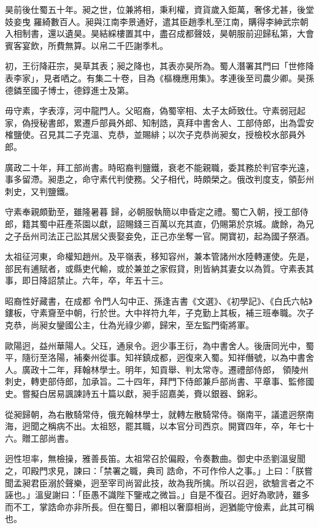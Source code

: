 \begin{pinyinscope}
 昊前後仕蜀五十年。昶之世，位兼將相，秉利權，資貨歲入鉅萬，奢侈尤甚，後堂妓妾曳
 羅綺數百人。昶與江南李景通好，遣其臣趙季札至江南，購得李紳武宗朝入相制書，還以遺昊。昊結綵樓置其中，盡召成都聲妓，昊朝服前迎歸私第，大會賓客宴飲，所費無算。以帛二千匹謝季札。



 初，王衍降莊宗，昊草其表；昶之降也，其表亦昊所為。蜀人潛署其門曰「世修降表李家」，見者哂之。有集二十卷，目為《樞機應用集》。孝連後至司農少卿。昊孫德鏻至國子博士，德錞進士及第。



 毋守素，字表淳，河中龍門人。父昭裔，偽蜀宰相、太子太師致仕。守素弱冠起家，偽授秘書郎，累遷戶部員外郎、知制誥，真拜中書舍人、工部侍郎，出為雲安榷鹽使。召見其二子克溫、克恭，並賜緋；以次子克恭尚昶女，授檢校水部員外郎。



 廣政二十年，拜工部尚書。時昭裔判鹽鐵，衰老不能親職，委其務於判官李光遠，事多留滯。昶患之，命守素代判使務。父子相代，時頗榮之。俄改判度支，領彭州刺史，又判鹽鐵。



 守素奉親頗勤至，雖隆暑暮
 歸，必朝服執簡以申昏定之禮。蜀亡入朝，授工部侍郎，籍其蜀中莊產茶園以獻，詔賜錢三百萬以充其直，仍賜第於京城。歲餘，為兄之子岳州司法正己訟其居父喪娶妾免，正己亦坐奪一官。開寶初，起為國子祭酒。



 太祖征河東，命權知趙州。及平嶺表，移知容州，兼本管諸州水陸轉運使。先是，部民有逋賦者，或縣吏代輸，或於兼並之家假貸，則皆納其妻女以為質。守素表其事，即日降詔禁止。六年，卒，年五十三。



 昭裔性好藏書，在成都
 令門人勾中正、孫逢吉書《文選》、《初學記》、《白氏六帖》鏤板，守素齎至中朝，行於世。大中祥符九年，子克勤上其板，補三班奉職。次子克恭，尚昶女鑾國公主，仕為光祿少卿，歸宋，至左監門衛將軍。



 歐陽迥，益州華陽人。父珏，通泉令。迥少事王衍，為中書舍人。後唐同光中，蜀平，隨衍至洛陽，補秦州從事。知祥鎮成都，迥復來入蜀。知祥僭號，以為中書舍人。廣政十二年，拜翰林學士。明年，知貢舉、判太常寺。遷禮部侍郎，
 領陵州刺史，轉吏部侍郎，加承旨。二十四年，拜門下侍郎兼戶部尚書、平章事、監修國史。嘗擬白居易諷諫詩五十篇以獻，昶手詔嘉美，賚以銀器、錦彩。



 從昶歸朝，為右散騎常侍，俄充翰林學士，就轉左散騎常侍。嶺南平，議遣迥祭南海，迥聞之稱病不出。太祖怒，罷其職，以本官分司西京。開寶四年，卒，年七十六。贈工部尚書。



 迥性坦率，無檢操，雅善長笛。太祖常召於偏殿，令奏數曲。御史中丞劉溫叟聞之，叩殿門求見，諫曰：「禁署之職，典司
 誥命，不可作伶人之事。」上曰：「朕嘗聞孟昶君臣溺於聲樂，迥至宰司尚習此技，故為我所擒。所以召迥，欲驗言者之不誣也。」溫叟謝曰：「臣愚不識陛下鑒戒之微旨。」自是不復召。迥好為歌詩，雖多而不工，掌誥命亦非所長。但在蜀日，卿相以奢靡相尚，迥猶能守儉素，此其可稱也。



\end{pinyinscope}